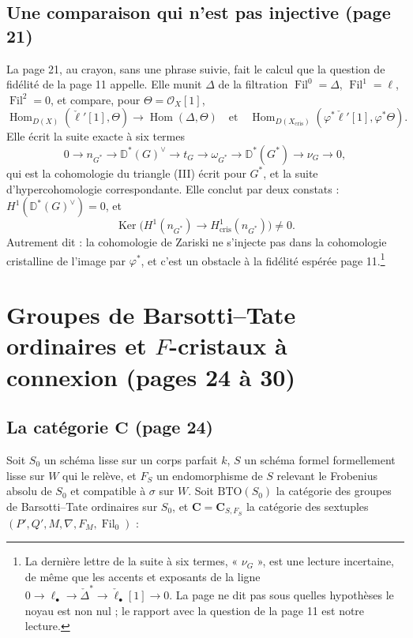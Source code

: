 \documentclass[11pt,a4paper]{article}
\begin{document}
\subsection*{Une comparaison qui n'est pas injective (page 21)}

La page 21, au crayon, sans une phrase suivie, fait le calcul que la question
de fidélité de la page 11 appelle. Elle munit $\Delta$ de la filtration
$\operatorname{Fil}^{0} = \Delta$, $\operatorname{Fil}^{1} = \ell$,
$\operatorname{Fil}^{2} = 0$, et compare, pour $\Theta =
\mathcal{O}_{X}[1]$,
\[
\operatorname{Hom}_{D(X)}(\check\ell'[1], \Theta) \to
\operatorname{Hom}(\Delta, \Theta)
\quad\text{et}\quad
\operatorname{Hom}_{D(X_{\mathrm{cris}})}(\varphi^{*}\check\ell'[1],
\varphi^{*}\Theta).
\]
Elle écrit la suite exacte à six termes
\[
0 \to n_{G^{*}} \to \mathbb{D}^{*}(G)^{\vee} \to t_{G} \to \omega_{G^{*}}
\to \mathbb{D}^{*}(G^{*}) \to \nu_{G} \to 0,
\]
qui est la cohomologie du triangle (III) écrit pour $G^{*}$, et la suite
d'hypercohomologie correspondante. Elle conclut par deux constats :
$H^{1}(\mathbb{D}^{*}(G)^{\vee}) = 0$, et
\[
\operatorname{Ker}\bigl(H^{1}(n_{G^{*}}) \to H^{1}_{\mathrm{cris}}(n_{G^{*}})\bigr)
\ne 0 .
\]
Autrement dit : la cohomologie de Zariski ne s'injecte pas dans la cohomologie
cristalline de l'image par $\varphi^{*}$, et c'est un obstacle à la fidélité
espérée page 11.\footnote{La dernière lettre de la suite à six termes,
« $\nu_{G}$ », est une lecture incertaine, de même que les accents et
exposants de la ligne $0 \to \ell_{\bullet} \to \check\Delta^{*} \to
\check\ell_{\bullet}[1] \to 0$. La page ne dit pas sous quelles hypothèses le
noyau est non nul ; le rapport avec la question de la page 11 est notre
lecture.}

\section*{Groupes de Barsotti--Tate ordinaires et $F$-cristaux à connexion (pages 24 à 30)}

\subsection*{La catégorie $\mathbf{C}$ (page 24)}

Soit $S_{0}$ un schéma lisse sur un corps parfait $k$, $S$ un schéma formel
formellement lisse sur $W$ qui le relève, et $F_{S}$ un endomorphisme de $S$
relevant le Frobenius absolu de $S_{0}$ et compatible à $\sigma$ sur $W$.
Soit $\mathrm{BTO}(S_{0})$ la catégorie des groupes de Barsotti--Tate
ordinaires sur $S_{0}$, et $\mathbf{C} = \mathbf{C}_{S, F_{S}}$ la catégorie
des sextuples $(P', Q', M, \nabla, F_{M}, \operatorname{Fil}_{0})$ :
\end{document}

